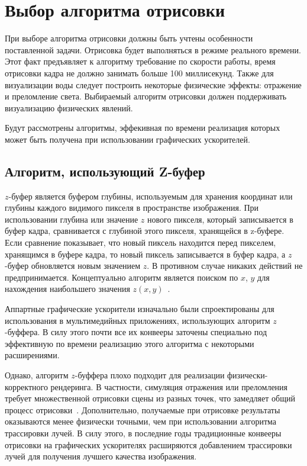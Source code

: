 \section{Выбор алгоритма отрисовки}

При выборе алгоритма отрисовки должны быть учтены особенности поставленной задачи.
Отрисовка будет выполняться в режиме реального времени. Этот факт 
предъявляет к алгоритму требование по скорости работы, время отрисовки кадра не должно занимать
больше 100 миллисекунд. Также для визуализации воды следует построить
некоторые физические эффекты: отражение и преломление света. Выбираемый алгоритм отрисовки
должен поддерживать визуализацию физических явлений.

Будут рассмотрены алгоритмы, эффекивная по времени реализация которых может быть получена при использовании
графических ускорителей. 

\subsection{Алгоритм, использующий Z-буфер}
$z$-буфер является буфером глубины, используемым для хранения координат или глубины 
каждого видимого пикселя в пространстве изображения. При использовании глубина или значение $z$ нового пикселя, 
который записывается в буфер кадра, сравнивается с глубиной этого пикселя, хранящейся в z-буфере. 
Если сравнение показывает, что новый пиксель находится перед пикселем, хранящимся в буфере кадра, 
то новый пиксель записывается в буфер кадра, а $z$-буфер обновляется новым значением $z$. 
В противном случае никаких действий не предпринимается. Концептуально алгоритм является поиском 
по $x$, $y$ для нахождения наибольшего значения $z(x, y)$~\cite{Rodzhers}.

Аппартные графические ускорители изначально были спроектированы для использования в мультимедийных
приложениях, использующих алгоритм $z$-буффера. В силу этого почти все их конвееры заточены
специально под эффективную по времени реализацию этого алгоритма с некоторыми расширениями. 

Однако, алгоритм $z$-буффера плохо подходит для реализации физически-корректного рендеринга.
В частности, симуляция отражения или преломления требует множественной отрисовки сцены
из разных точек, что замедляет общий процесс отрисовки~\cite{FoCG}. Дополнительно, получаемые при отрисовке
результаты оказываются менее физически точными, чем при использовании алгоритма трассировки лучей. 
В силу этого, в последние годы традиционные конвееры отрисовки на графических ускорителях 
расширяются добавлением трассировки лучей для получения лучшего качества изображения.

